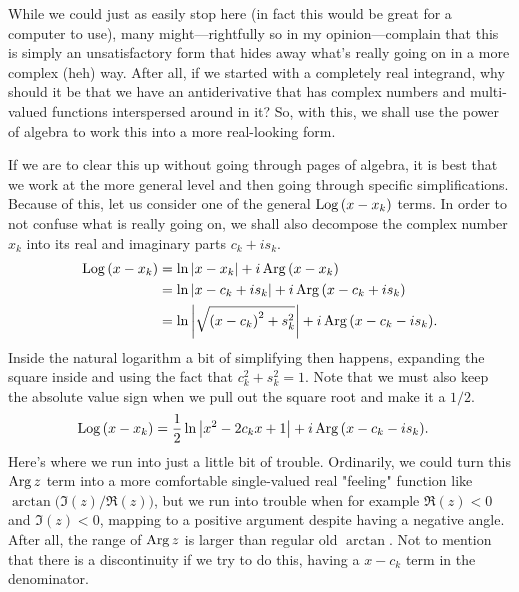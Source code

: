 While we could just as easily stop here (in fact this would be great for a
computer to use), many might---rightfully so in my opinion---complain that this
is simply an unsatisfactory form that hides away what's really going on in a
more complex (heh) way. After all, if we started with a completely real
integrand, why should it be that we have an antiderivative that has complex
numbers and multi-valued functions interspersed around in it? So, with this, we shall use the power of algebra to work this into a more real-looking form.

If we are to clear this up without going through pages of algebra, it is best
that we work at the more general level and then going through specific
simplifications. Because of this, let us consider one of the general \(
\operatorname{Log}{\left( x - x_k \right)} \) terms. In order to not confuse what is really
going on, we shall also decompose the complex number \( x_k \) into its real and imaginary parts \( c_k + i s_k \).
\begin{align*}
    \operatorname{Log}{\left( x - x_k \right)} &= \ln{\ensuremath{\left\lvert x - x_k \right\rvert}} + i \operatorname{Arg}{\left( x - x_k \right)} \\
    &= \ln{\ensuremath{\left\lvert x - c_k + i s_k \right\rvert}} + i \operatorname{Arg}{\left( x - c_k + i s_k \right)} \\
    &= \ln{\ensuremath{\left\lvert \sqrt{\left( x - c_k \right)^2 + s_k^2} \right\rvert}} + i \operatorname{Arg}{\left( x - c_k - i s_k \right)}
.\end{align*}
Inside the natural logarithm a bit of simplifying then happens, expanding the
square inside and using the fact that \( c_k^2 + s_k^2 = 1 \). Note that we
must also keep the absolute value sign when we pull out the square root and
make it a \( 1/2 \).
\begin{align*}
    \operatorname{Log}{\left( x - x_k \right)} &= \frac{1}{2} \ln{\ensuremath{\left\lvert x^2 - 2 c_k x + 1 \right\rvert}} + i \operatorname{Arg}{\left( x - c_k - i s_k \right)}
.\end{align*}
Here's where we run into just a little bit of trouble. Ordinarily, we could
turn this \( \operatorname{Arg} z \) term into a more comfortable single-valued real
"feeling" function like \( \arctan{\bigl( \Im \left( z \right) / \Re \left( z
\right) \bigr)} \), but we run into trouble when for example \( \Re \left( z
\right) < 0 \) and \( \Im \left( z \right) < 0 \), mapping to a positive
argument despite having a negative angle. After all, the range of \( \operatorname{Arg} z \)
is larger than regular old \( \arctan \). Not to mention that there is a
discontinuity if we try to do this, having a \( x - c_k \) term in the
denominator.

